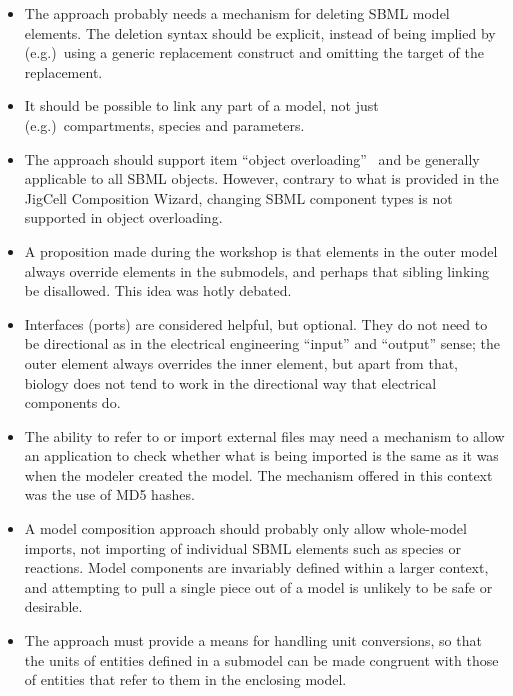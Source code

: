 \begin{enumerate}
\begin{itemize}
  \item The approach probably needs a mechanism for deleting SBML
    model elements.  The deletion syntax should be explicit, instead
    of being implied by (e.g.)\ using a generic replacement construct
    and omitting the target of the replacement.

  \item It should be possible to link any part of a model, not just
    (e.g.)\ compartments, species and parameters.

  \item The approach should support item ``object
    overloading''~\citep{various:2007b} and be generally applicable to
    all SBML objects.  However, contrary to what is provided in the
    JigCell Composition Wizard, changing SBML component types is not
    supported in object overloading.

  \item A proposition made during the workshop is that elements in the
    outer model always override elements in the submodels, and perhaps
    that sibling linking be disallowed.  This idea was hotly debated.

  \item Interfaces (ports) are considered helpful, but optional.  They
    do not need to be directional as in the electrical engineering
    ``input'' and ``output'' sense; the outer element always overrides
    the inner element, but apart from that, biology does not tend to
    work in the directional way that electrical components do.

  \item The ability to refer to or import external files may need a
    mechanism to allow an application to check whether what is being
    imported is the same as it was when the modeler created the
    model.  The mechanism offered in this context was the use of MD5
    hashes.

  \item A model composition approach should probably only allow
    whole-model imports, not importing of individual SBML elements such
    as species or reactions.  Model components are invariably defined
    within a larger context, and attempting to pull a single piece out
    of a model is unlikely to be safe or desirable.

  \item The approach must provide a means for handling unit conversions,
    so that the units of entities defined in a submodel can be made
    congruent with those of entities that refer to them in the enclosing
    model.

  \end{itemize}

\end{enumerate}

